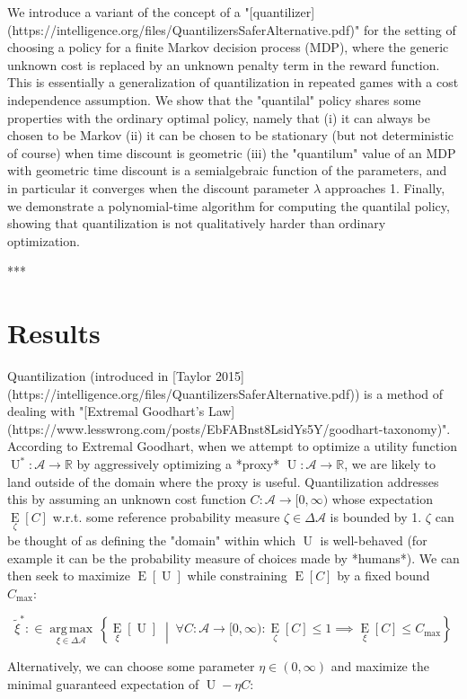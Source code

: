 \documentclass[a4paper]{article}
\newcommand{\AB}[1]{\left[#1\right]}
\newcommand{\ACM}[2]{\left\{#1\;\middle\vert\;#2\right\}}
\newcommand{\Ea}[2]{\underset{#1}{\operatorname{E}}\AB{#2}}
\newcommand{\Argmax}[1]{\underset{#1}{\operatorname{arg\,max}}\,}
\newcommand{\Reals}{\mathbb{R}}
\newcommand{\A}{\mathcal{A}}
\newcommand{\Ut}{\operatorname{U}}
\newcommand{\Co}{C}
\begin{document}
We introduce a variant of the concept of a "[quantilizer](https://intelligence.org/files/QuantilizersSaferAlternative.pdf)" for the setting of choosing a policy for a finite Markov decision process (MDP), where the generic unknown cost is replaced by an unknown penalty term in the reward function. This is essentially a generalization of quantilization in repeated games with a cost independence assumption. We show that the "quantilal" policy shares some properties with the ordinary optimal policy, namely that (i) it can always be chosen to be Markov (ii) it can be chosen to be stationary (but not deterministic of course) when time discount is geometric (iii) the "quantilum" value of an MDP with geometric time discount is a semialgebraic function of the parameters, and in particular it converges when the discount parameter $\lambda$ approaches 1. Finally, we demonstrate a polynomial-time algorithm for computing the quantilal policy, showing that quantilization is not qualitatively harder than ordinary optimization.

***

\section{Results}

Quantilization (introduced in [Taylor 2015](https://intelligence.org/files/QuantilizersSaferAlternative.pdf)) is a method of dealing with "[Extremal Goodhart's Law](https://www.lesswrong.com/posts/EbFABnst8LsidYs5Y/goodhart-taxonomy)". According to Extremal Goodhart, when we attempt to optimize a utility function $\Ut^*: \A \rightarrow \Reals$ by aggressively optimizing a *proxy* $\Ut: \A \rightarrow \Reals$, we are likely to land outside of the domain where the proxy is useful. Quantilization addresses this by assuming an unknown cost function $\Co: \A \rightarrow [0,\infty)$ whose expectation $\Ea{\zeta}{\Co}$ w.r.t. some reference probability measure $\zeta \in \Delta\A$ is bounded by 1. $\zeta$ can be thought of as defining the "domain" within which $\Ut$ is well-behaved (for example it can be the probability measure of choices made by *humans*). We can then seek to maximize $\Ea{}{\Ut}$ while constraining $\Ea{}{\Co}$ by a fixed bound $C_{\max}$:

$$\tilde{\xi}^* :\in \Argmax{\xi \in \Delta\A}\ACM{\Ea{\xi}{\Ut}}{\forall \Co: \A \rightarrow [0,\infty): \Ea{\zeta}{\Co} \leq 1 \implies \Ea{\xi}{\Co} \leq C_{\max}}$$

Alternatively, we can choose some parameter $\eta\in(0,\infty)$ and maximize the minimal guaranteed expectation of $\Ut-\eta \Co$:
\end{document}
